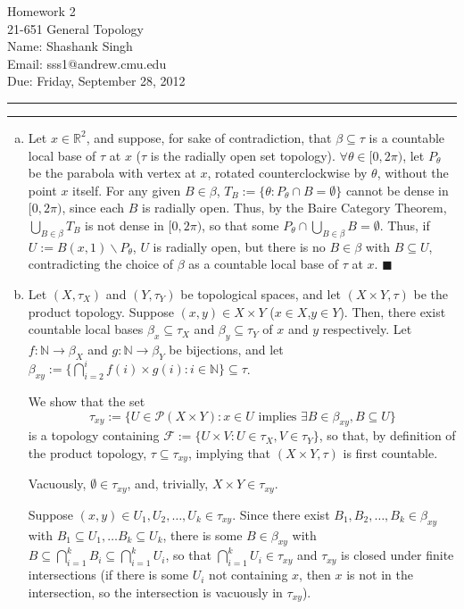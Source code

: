 \documentclass[11pt]{article}
\makeatletter
\newcounter{questionCounter}
\newcounter{partCounter}[questionCounter]
\newenvironment{question}[2][\arabic{questionCounter}]{%
    \setcounter{partCounter}{0}%
    \vspace{.25in} \hrule \vspace{0.5em}%
        \noindent{\bf #2}%
    \vspace{0.8em} \hrule \vspace{.10in}%
    \addtocounter{questionCounter}{1}%
}{}
\newcommand{\myname}{Shashank Singh}
\newcommand{\myandrew}{sss1@andrew.cmu.edu}
\newcommand{\myclass}{21-651 General Topology}
\newcommand{\myhwnum}{2}
\newcommand{\duedate}{Friday, September 28, 2012}
\renewcommand{\qed}{\quad $\blacksquare$}
\newcommand{\sminus}{\backslash}
\newcommand{\N}{\mathbb{N}} %
\newcommand{\R}{\mathbb{R}} %
\newcommand{\pow}[1]{\mathcal{P}\left(#1\right)} %
\makeatother
\begin{document}
\thispagestyle{plain}

{\Large Homework \myhwnum} \\
\myclass \\
Name: \myname \\
Email: \myandrew \\
Due: \duedate \\
\begin{question}{Problem 1}
\begin{enumerate}[(a)]
\item Let $x \in \R^2$, and suppose, for sake of contradiction, that
$\beta \subseteq \tau$ is a countable local base of $\tau$ at $x$ ($\tau$ is
the radially open set topology). $\forall \theta \in [0,2\pi)$, let
$P_{\theta}$ be the parabola with vertex at $x$, rotated counterclockwise by
$\theta$, without the point $x$ itself. For any given $B \in \beta$,
$T_B := \{\theta : P_\theta \cap B = \emptyset\}$ cannot be dense in
$[0,2\pi)$, since each $B$ is radially open. Thus, by the Baire Category
Theorem, $\bigcup_{B \in \beta} T_B$ is not dense in $[0,2\pi)$, so that some
$P_{\theta} \cap \bigcup_{B \in \beta} B = \emptyset$. Thus, if
$U := B(x,1) \sminus P_{\theta}$, $U$ is radially open, but there is no
$B \in \beta$ with $B \subseteq U$, contradicting the choice of $\beta$ as a
countable local base of $\tau$ at $x$. \qed

\item Let $(X,\tau_X)$ and $(Y,\tau_Y)$ be topological spaces, and let
$(X \times Y,\tau)$ be the product topology. Suppose $(x,y) \in X \times Y$
($x \in X$,$y \in Y$). Then, there exist countable local bases
$\beta_x \subseteq \tau_X$ and $\beta_y \subseteq \tau_Y$ of $x$ and $y$
respectively. Let $f: \N \rightarrow \beta_X$ and $g: \N \rightarrow \beta_Y$
be bijections, and let
$\beta_{xy} := \{\bigcap_{i = 2}^i f(i) \times g(i) : i \in \N\} \subseteq \tau$.

We show that the set
\[\tau_{xy}
  := \{U \in \pow{X \times Y} :
    x \in U \mbox{ implies } \exists B \in \beta_{xy}, B \subseteq U\}
\]
is a topology containing
$\mathcal{F} := \{U \times V : U \in \tau_X, V \in \tau_Y\}$, so that, by
definition of the product topology, $\tau \subseteq \tau_{xy}$, implying that
$(X \times Y,\tau)$ is first countable.

Vacuously, $\emptyset \in \tau_{xy}$, and, trivially,
$X \times Y \in \tau_{xy}$.

Suppose $(x,y) \in U_1,U_2,\ldots,U_k \in \tau_{xy}$. Since there exist
$B_1,B_2,\ldots,B_k \in \beta_{xy}$ with
$B_1 \subseteq U_1,\ldots B_k \subseteq U_k$, there is some $B \in \beta_{xy}$
with $B \subseteq \bigcap_{i = 1}^{k} B_i \subseteq \bigcap_{i = 1}^{k} U_i$,
so that $\bigcap_{i = 1}^{k} U_i \in \tau_{xy}$ and $\tau_{xy}$ is closed
under finite intersections (if there is some $U_i$ not containing $x$, then
$x$ is not in the intersection, so the intersection is vacuously in
$\tau_{xy}$).


\end{enumerate}
\end{question}
\end{document}

